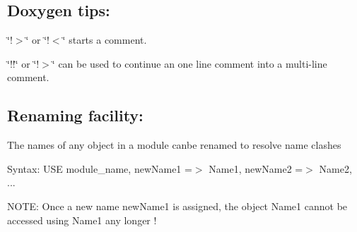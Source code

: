 \subsection*{Doxygen tips\+:}


\begin{DoxyItemize}
\item \char`\"{}!$>$\char`\"{} or \char`\"{}!$<$\char`\"{} starts a comment.
\item \char`\"{}!!\char`\"{} or \char`\"{}!$>$\char`\"{} can be used to continue an one line comment into a multi-\/line comment.
\end{DoxyItemize}

\subsection*{Renaming facility\+:}

The names of any object in a module canbe renamed to resolve name clashes
\begin{DoxyItemize}
\item Syntax\+: U\+S\+E module\+\_\+name, new\+Name1 =$>$ Name1, new\+Name2 =$>$ Name2, ...
\item N\+O\+T\+E\+: Once a new name new\+Name1 is assigned, the object Name1 cannot be accessed using Name1 any longer ! 
\end{DoxyItemize}